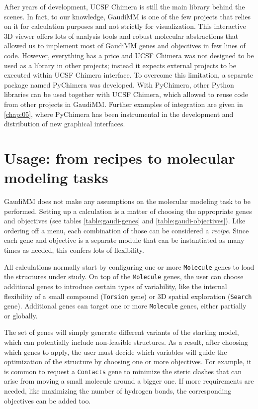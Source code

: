 After years of development, UCSF Chimera is still the main library behind the scenes. In fact, to our knowledge, GaudiMM is one of the few projects that relies on it for calculation purposes and not strictly for visualization. This interactive 3D viewer offers lots of analysis tools and robust molecular abstractions that allowed us to implement most of GaudiMM genes and objectives in few lines of code. However, everything has a price and UCSF Chimera was not designed to be used as a library in other projects; instead it expects external projects to be executed within UCSF Chimera interface. To overcome this limitation, a separate package named PyChimera was developed. With PyChimera, other Python libraries can be used together with UCSF Chimera, which allowed to reuse code from other projects in GaudiMM. Further examples of integration are given in \autoref{chap:05}, where PyChimera has been instrumental in the development and distribution of new graphical interfaces.

\section{Usage: from recipes to molecular modeling tasks}

GaudiMM does not make any assumptions on the molecular modeling task to be performed. Setting up a calculation is a matter of choosing the appropriate genes and objectives (see tables \ref{table:gaudi-genes} and \ref{table:gaudi-objectives}). Like ordering off a menu, each combination of those can be considered a \textit{recipe}. Since each gene and objective is a separate module that can be instantiated as many times as needed, this confers lots of flexibility.

All calculations normally start by configuring one or more \texttt{Molecule} genes to load the structures under study. On top of the \texttt{Molecule} genes, the user can choose additional genes to introduce certain types of variability, like the internal flexibility of a small compound (\texttt{Torsion} gene) or 3D spatial exploration (\texttt{Search} gene). Additional genes can target one or more \texttt{Molecule} genes, either partially or globally.

The set of genes will simply generate different variants of the starting model, which can potentially include non-feasible structures. As a result, after choosing which genes to apply, the user must decide which variables will guide the optimization of the structure by choosing one or more objectives. For example, it is common to request a \texttt{Contacts} gene to minimize the steric clashes that can arise from moving a small molecule around a bigger one.  If more requirements are needed, like maximizing the number of hydrogen bonds, the corresponding objectives can be added too.

